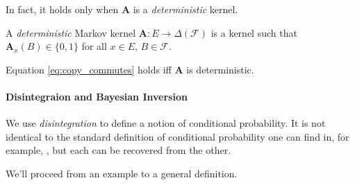 In fact, it holds only when $\mathbf{A}$ is a \emph{deterministic} kernel.

\begin{definition}
A \emph{deterministic} Markov kernel $\mathbf{A}:E\to \Delta(\mathcal{F})$ is a kernel such that $\mathbf{A}_x(B)\in\{0,1\}$ for all $x\in E$, $B\in\mathcal{F}$.
\end{definition}

\begin{theorem}
Equation \ref{eq:copy_commutes} holds iff $\mathbf{A}$ is deterministic.
\end{theorem}

\paragraph{Disintegraion and Bayesian Inversion}\label{pgph:disint}


We use \emph{disintegration} to define a notion of conditional probability. It is not identical to the standard definition of conditional probability one can find in, for example, \citet{cinlar_probability_2011}, but each can be recovered from the other.

We'll proceed from an example to a general definition. 


